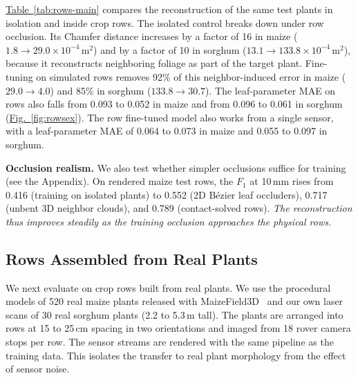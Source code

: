 \documentclass[10pt,twocolumn,letterpaper]{article}
\newcommand{\figref}[1]{\hyperref[#1]{Fig.~\ref*{#1}}}
\newcommand{\tabref}[1]{\hyperref[#1]{Table~\ref*{#1}}}
\newcommand{\appendixref}[1]{\hyperref[#1]{Appendix~\ref*{#1}}}
\begin{document}
\tabref{tab:rows-main} compares the reconstruction of the same test plants in isolation and inside crop rows. The isolated control breaks down under row occlusion. Its Chamfer distance increases by a factor of 16 in maize ($1.8 \to 29.0 \times 10^{-4}\,\mathrm{m}^2$) and by a factor of 10 in sorghum ($13.1 \to 133.8 \times 10^{-4}\,\mathrm{m}^2$), because it reconstructs neighboring foliage as part of the target plant. Fine-tuning on simulated rows removes 92\% of this neighbor-induced error in maize ($29.0 \to 4.0$) and 85\% in sorghum ($133.8 \to 30.7$). The leaf-parameter MAE on rows also falls from 0.093 to 0.052 in maize and from 0.096 to 0.061 in sorghum (\figref{fig:rowsex}). The row fine-tuned model also works from a single sensor, with a leaf-parameter MAE of 0.064 to 0.073 in maize and 0.055 to 0.097 in sorghum.


\noindent\textbf{Occlusion realism.}
We also test whether simpler occlusions suffice for training (see the Appendix). On rendered maize test rows, the $F_1$ at 10\,mm rises from 0.416 (training on isolated plants) to 0.552 (2D B\'ezier leaf occluders), 0.717 (unbent 3D neighbor clouds), and 0.789 (contact-solved rows). \textit{The reconstruction thus improves steadily as the training occlusion approaches the physical rows.}

\subsection{Rows Assembled from Real Plants}
\label{sec:res-field}\label{sec:exp-real}


We next evaluate on crop rows built from real plants. We use the procedural models of 520 real maize plants released with MaizeField3D~\citep{maizefield3d2025} and our own laser scans of 30 real sorghum plants (2.2 to 5.3\,m tall). The plants are arranged into rows at 15 to 25\,cm spacing in two orientations and imaged from 18 rover camera stops per row. The sensor streams are rendered with the same pipeline as the training data. This isolates the transfer to real plant morphology from the effect of sensor noise.
\end{document}
